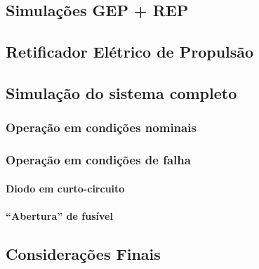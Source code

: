 
%
\cleardoublepage
{}


\begin{braziltext}

    \chapter[Simulações]{Simulações GEP + REP}


    \section{Retificador Elétrico de Propulsão}


    \section{Simulação do sistema completo}


    \subsection{Operação em condições nominais}


    \subsection{Operação em condições de falha}


    \subsubsection{Diodo em curto-circuito}


    \subsubsection{``Abertura'' de fusível}


    \section{Considerações Finais}

\end{braziltext}


